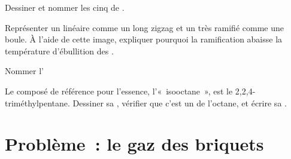 \begin{exercise}[$\star\star\star$]\label{exo:g11:organic-skeletons:12}
Dessiner et nommer les cinq  de .
\end{exercise}

\begin{exercise}[$\star\star\star$]\label{exo:g11:organic-skeletons:13}
Représenter un  linéaire comme un long zigzag et un  très
ramifié comme une boule. À l'aide de cette image, expliquer pourquoi la
ramification abaisse la température d'ébullition des .
\end{exercise}

\begin{exercise}[$\star\star\star$]\label{exo:g11:organic-skeletons:14}
Nommer l'
\begin{center}
\end{center}
\end{exercise}

\begin{exercise}[$\star\star\star$]\label{exo:g11:organic-skeletons:15}
Le composé de référence pour l'essence, l'«~isooctane~», est le
2,2,4-triméthylpentane. Dessiner sa , vérifier que
c'est un  de l'octane, et écrire sa .
\end{exercise}

\section{Problème~: le gaz des briquets}

